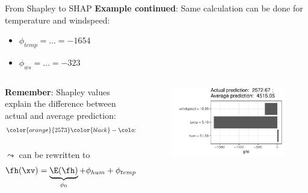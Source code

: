 \documentclass[11pt,compress,t,notes=noshow, aspectratio=169, xcolor=table]{beamer}
\begin{document}
\begin{frame}{From Shapley to SHAP}
\textbf{Example continued}: Same calculation can be done for temperature and windspeed:
\begin{itemize}
    \item $\phi_{temp} = \ldots = -1654$
    \item $\phi_{ws} = \ldots = -323$
\end{itemize}

\begin{columns}[T]
\begin{column}{0.5\textwidth}
\textbf{Remember}: Shapley values explain the difference between actual and average prediction:
\begin{eqnarray*}
\color{orange}{2573} \color{black}- \color{blue}{4515} \color{black} = &34 - 1654 - 323 &= - 1942\\
\fh(\xv) - \E(\fh) =& \phi_{hum} + \phi_{temp} + \phi_{ws}&\\
\end{eqnarray*}
$\leadsto$ can be rewritten to
$$
\fh(\xv) = \underbrace{\E(\fh)}_{\phi_0} + \phi_{hum} + \phi_{temp} + \phi_{ws}
$$
\end{column}
\begin{column}{0.5\textwidth}
\begin{figure}
    \centering
    \includegraphics[width=0.9\columnwidth]{figure/shapley2shap.pdf}
\end{figure}




\end{column}
\end{columns}




\end{frame}
\end{document}

